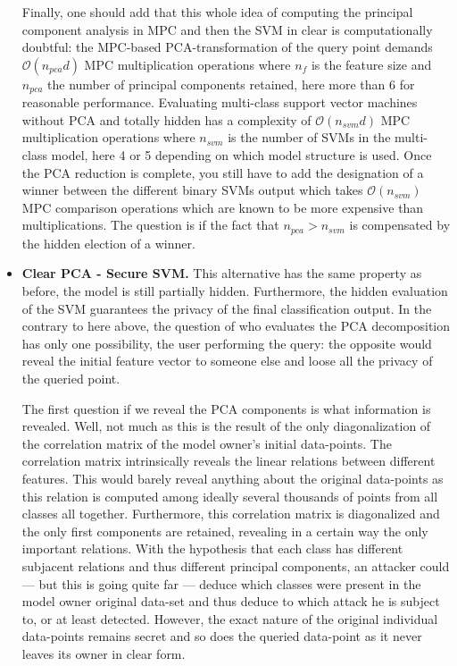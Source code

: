\begin{itemize}
    Finally, one should add that this whole idea of computing the principal component analysis in MPC and then the SVM in clear is computationally doubtful: the MPC-based PCA-transformation of the query point demands $\mathcal{O}\left(n_{pca}d\right)$ MPC multiplication operations where $n_f$ is the feature size and $n_{pca}$ the number of principal components retained, here more than 6 for reasonable performance. Evaluating multi-class support vector machines without PCA and totally hidden has a complexity of $\mathcal{O}(n_{svm}d)$ MPC multiplication operations where $n_{svm}$ is the number of SVMs in the multi-class model, here 4 or 5 depending on which model structure is used. Once the PCA reduction is complete, you still have to add the designation of a winner between the different binary SVMs output which takes $\mathcal{O}(n_{svm})$ MPC comparison operations which are known to be more expensive than multiplications. The question is if the fact that $n_{pca} > n_{svm}$ is compensated by the hidden election of a winner.
    
    \item \textbf{Clear PCA - Secure SVM.}
    This alternative has the same property as before, the model is still partially hidden. Furthermore, the hidden evaluation of the SVM guarantees the privacy of the final classification output. In the contrary to here above, the question of who evaluates the PCA decomposition has only one possibility, the user performing the query: the opposite would reveal the initial feature vector to someone else and loose all the privacy of the queried point.
    
    The first question if we reveal the PCA components is what information is revealed. Well, not much as this is the result of the only diagonalization of the correlation matrix of the model owner's initial data-points. The correlation matrix intrinsically reveals the linear relations between different features. This would barely reveal anything about the original data-points as this relation is computed among ideally several thousands of points from all classes all together. Furthermore, this correlation matrix is diagonalized and the only first components are retained, revealing in a certain way the only important relations. With the hypothesis that each class has different subjacent relations and thus different principal components, an attacker could --- but this is going quite far --- deduce which classes were present in the model owner original data-set and thus deduce to which attack he is subject to, or at least detected. However, the exact nature of the original individual data-points remains secret and so does the queried data-point as it never leaves its owner in clear form.
    

\end{itemize}
